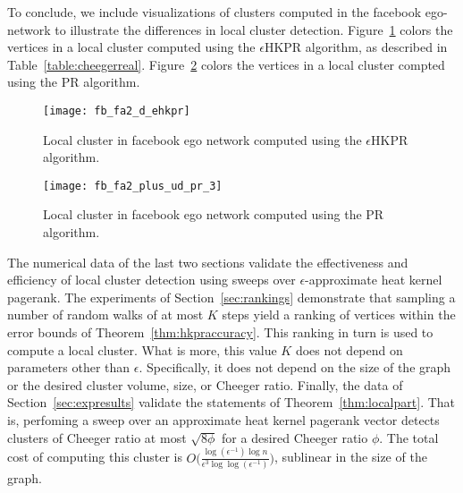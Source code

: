 \documentclass[runningheads,a4paper]{llncs}
\newcommand{\hkprcomplexity}{O\big(\frac{\log(\epsilon^{-1})\log n}{\epsilon^3\log\log(\epsilon^{-1})}\big)}
\begin{document}
To conclude, we include visualizations of clusters computed in the facebook
ego-network to illustrate the differences in local cluster detection.
Figure~\ref{fig:fb_ehkpr} colors the vertices in a local cluster computed using
the $\epsilon$HKPR algorithm, as described in Table~\ref{table:cheegerreal}.
Figure~\ref{fig:fb_pr} colors the vertices in a local cluster compted using the
PR algorithm.

\begin{figure}
\centering
\texttt{[image: fb\_fa2\_d\_ehkpr]}
\caption{Local cluster in facebook ego network computed using the $\epsilon$HKPR
algorithm.}
\label{fig:fb_ehkpr}
\end{figure}

\begin{figure}
\centering
\texttt{[image: fb\_fa2\_plus\_ud\_pr\_3]}
\caption{Local cluster in facebook ego network computed using the PR
algorithm.}
\label{fig:fb_pr}
\end{figure}

The numerical data of the last two sections validate the effectiveness and
efficiency of local cluster detection using sweeps over $\epsilon$-approximate
heat kernel pagerank.  The experiments of Section~\ref{sec:rankings} demonstrate
that sampling a number of random walks of at most $K$ steps yield a ranking of
vertices within the error bounds of Theorem~\ref{thm:hkpraccuracy}.  This ranking
in turn is used to compute a local cluster.  What is more, this value $K$ does
not depend on parameters other than $\epsilon$.  Specifically, it does not
depend on the size of the graph or the desired cluster volume, size, or Cheeger
ratio.  Finally, the data of Section~\ref{sec:expresults} validate the
statements of Theorem~\ref{thm:localpart}.  That is, perfoming a sweep over an
approximate heat kernel pagerank vector detects clusters of Cheeger ratio at
most $\sqrt{8\phi}$ for a desired Cheeger ratio $\phi$.  The total cost of
computing this cluster is $\hkprcomplexity$, sublinear in the size of the graph. 



  
\end{document}
